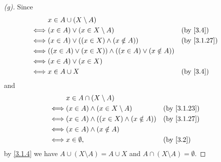 \begin{proof}[(g)]
  Since
  \begin{align*}
         & x \in A \cup (X \setminus A)                                                    \\
    \iff & (x \in A) \lor (x \in X \setminus A)                           &  & \by{3.4}    \\
    \iff & (x \in A) \lor ((x \in X) \land (x \notin A))                  &  & \by{3.1.27} \\
    \iff & ((x \in A) \lor (x \in X)) \land ((x \in A) \lor (x \notin A))                  \\
    \iff & (x \in A) \lor (x \in X)                                                        \\
    \iff & x \in A \cup X                                                 &  & \by{3.4}
  \end{align*}
  and
  \begin{align*}
         & x \in A \cap (X \setminus A)                                    \\
    \iff & (x \in A) \land (x \in X \setminus A)          &  & \by{3.1.23} \\
    \iff & (x \in A) \land ((x \in X) \land (x \notin A)) &  & \by{3.1.27} \\
    \iff & (x \in A) \land (x \notin A)                                    \\
    \iff & x \in \emptyset,                               &  & \by{3.2}
  \end{align*}
  by \cref{3.1.4} we have \(A \cup (X \setminus A) = A \cup X\) and \(A \cap (X \setminus A) = \emptyset\).
\end{proof}

